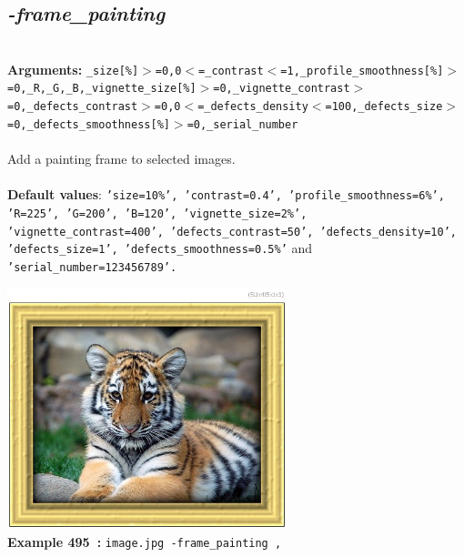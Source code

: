 \documentclass[a4paper,11pt,twoside]{book}
\begin{document}
\subsection{\emph{-frame\_painting} }\vspace*{-0.5em}
~\\\textbf{Arguments: } 
{\small \texttt{\_size[\%]$>$=0,0$<$=\_contrast$<$=1,\_profile\_smoothness[\%]$>$=0,\_R,\_G,\_B,\_vignette\_size[\%]$>$=0,\_vignette\_contrast$>$=0,\_defects\_contrast$>$=0,0$<$=\_defects\_density$<$=100,\_defects\_size$>$=0,\_defects\_smoothness[\%]$>$=0,\_serial\_number}}\\~\\
Add a painting frame to selected images.
~\\~\\\textbf{Default values}: {\small \texttt{'size=10\%', 'contrast=0.4', 'profile\_smoothness=6\%', 'R=225', 'G=200', 'B=120', 'vignette\_size=2\%', 'vignette\_contrast=400', 'defects\_contrast=50', 'defects\_density=10', 'defects\_size=1', 'defects\_smoothness=0.5\%'} and \texttt{'serial\_number=123456789'.}}
\begin{center}\includegraphics[keepaspectratio=true,height=7cm,width=\textwidth]{img/gmic_def495.jpg}\\
{\footnotesize \textbf{Example 495~:} \texttt{image.jpg -frame\_painting ,}}
\end{center}
\end{document}
